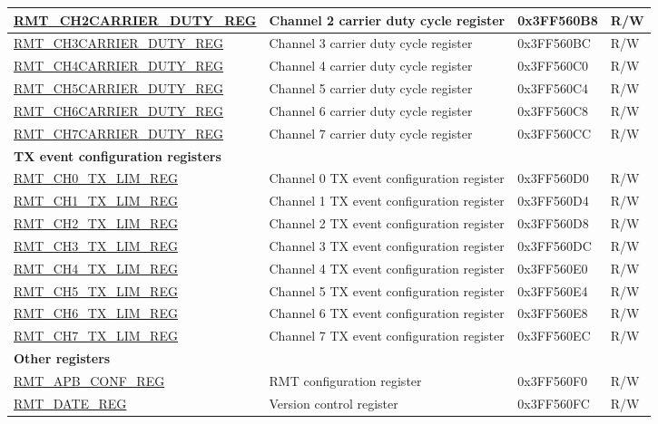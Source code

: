 \begin{longtable}{ |p{5cm}|p{6.6cm}|p{2.2cm}|p{1.2cm}| }
\hyperref[regdesc:RMTCHnCARRIERDUTYREG]{RMT\_CH2CARRIER\_DUTY\_REG} & Channel 2 carrier duty cycle register & 0x3FF560B8 & R/W \\ \hline
\hyperref[regdesc:RMTCHnCARRIERDUTYREG]{RMT\_CH3CARRIER\_DUTY\_REG} & Channel 3 carrier duty cycle register & 0x3FF560BC & R/W \\ \hline
\hyperref[regdesc:RMTCHnCARRIERDUTYREG]{RMT\_CH4CARRIER\_DUTY\_REG} & Channel 4 carrier duty cycle register & 0x3FF560C0 & R/W \\ \hline
\hyperref[regdesc:RMTCHnCARRIERDUTYREG]{RMT\_CH5CARRIER\_DUTY\_REG} & Channel 5 carrier duty cycle register & 0x3FF560C4 & R/W \\ \hline
\hyperref[regdesc:RMTCHnCARRIERDUTYREG]{RMT\_CH6CARRIER\_DUTY\_REG} & Channel 6 carrier duty cycle register & 0x3FF560C8 & R/W \\ \hline
\hyperref[regdesc:RMTCHnCARRIERDUTYREG]{RMT\_CH7CARRIER\_DUTY\_REG} & Channel 7 carrier duty cycle register & 0x3FF560CC & R/W \\ \hline
\multicolumn{4}{|l|}{\textbf{TX event configuration registers}} \\ \hline
\hyperref[regdesc:RMTCHnTXLIMREG]{RMT\_CH0\_TX\_LIM\_REG} & Channel 0 TX event configuration register & 0x3FF560D0 & R/W \\ \hline
\hyperref[regdesc:RMTCHnTXLIMREG]{RMT\_CH1\_TX\_LIM\_REG} & Channel 1 TX event configuration register & 0x3FF560D4 & R/W \\ \hline
\hyperref[regdesc:RMTCHnTXLIMREG]{RMT\_CH2\_TX\_LIM\_REG} & Channel 2 TX event configuration register & 0x3FF560D8 & R/W \\ \hline
\hyperref[regdesc:RMTCHnTXLIMREG]{RMT\_CH3\_TX\_LIM\_REG} & Channel 3 TX event configuration register & 0x3FF560DC & R/W \\ \hline
\hyperref[regdesc:RMTCHnTXLIMREG]{RMT\_CH4\_TX\_LIM\_REG} & Channel 4 TX event configuration register & 0x3FF560E0 & R/W \\ \hline
\hyperref[regdesc:RMTCHnTXLIMREG]{RMT\_CH5\_TX\_LIM\_REG} & Channel 5 TX event configuration register & 0x3FF560E4 & R/W \\ \hline
\hyperref[regdesc:RMTCHnTXLIMREG]{RMT\_CH6\_TX\_LIM\_REG} & Channel 6 TX event configuration register & 0x3FF560E8 & R/W \\ \hline
\hyperref[regdesc:RMTCHnTXLIMREG]{RMT\_CH7\_TX\_LIM\_REG} & Channel 7 TX event configuration register & 0x3FF560EC & R/W \\ \hline
\multicolumn{4}{|l|}{\textbf{Other registers}} \\ \hline
\hyperref[regdesc:RMTAPBCONFREG]{RMT\_APB\_CONF\_REG} & RMT configuration register & 0x3FF560F0 & R/W \\ \hline
\hyperref[regdesc:RMTDATEREG]{RMT\_DATE\_REG} & Version control register & 0x3FF560FC & R/W \\ \hline
\end{longtable}
